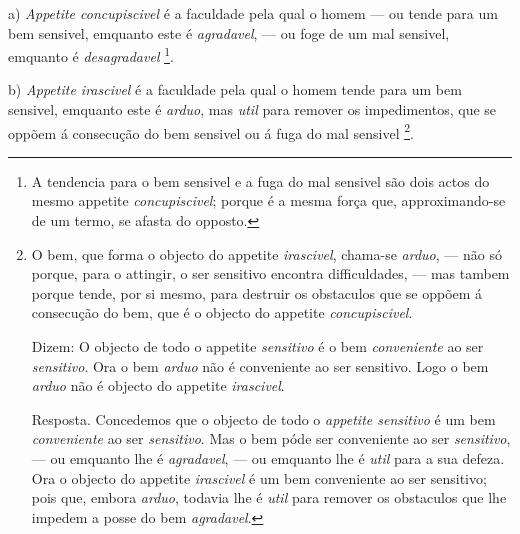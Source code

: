 a) \emph{Appetite concupiscivel} é a faculdade pela qual o homem --- ou tende para um bem sensivel, emquanto este é \emph{agradavel}, --- ou foge de um mal sensivel, emquanto é \emph{desagradavel} \footnote{A tendencia para o bem sensivel e a fuga do mal sensivel são dois actos do mesmo appetite \emph{concupiscivel}; porque é a mesma força que, approximando-se de um termo, se afasta do opposto.}.

b) \emph{Appetite irascivel} é a faculdade pela qual o homem tende para um bem sensivel, emquanto este é \emph{arduo}, mas \emph{util} para remover os impedimentos, que se oppõem á consecução do bem sensivel ou á fuga do mal sensivel \footnote{O bem, que forma o objecto do appetite \emph{irascivel}, chama-se \emph{arduo}, --- não só porque, para o attingir, o ser sensitivo encontra difficuldades, --- mas tambem porque tende, por si mesmo, para destruir os obstaculos que se oppõem á consecução do bem, que é o objecto do appetite \emph{concupiscivel}.\par Dizem: O objecto de todo o appetite \emph{sensitivo} é o bem \emph{conveniente} ao ser \emph{sensitivo}. Ora o bem \emph{arduo} não é conveniente ao ser sensitivo. Logo o bem \emph{arduo} não é objecto do appetite \emph{irascivel}.\par Resposta. Concedemos que o objecto de todo o \emph{appetite sensitivo} é um bem \emph{conveniente} ao ser \emph{sensitivo}. Mas o bem póde ser conveniente ao ser \emph{sensitivo}, --- ou emquanto lhe é \emph{agradavel}, --- ou emquanto lhe é \emph{util} para a sua defeza. Ora o objecto do appetite \emph{irascivel} é um bem conveniente ao ser sensitivo; pois que, embora \emph{arduo}, todavia lhe é \emph{util} para remover os obstaculos que lhe impedem a posse do bem \emph{agradavel}.}.

